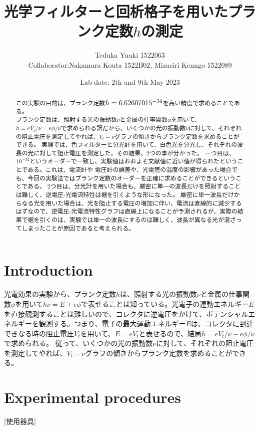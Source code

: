 \documentclass[a4paper,12pt]{jsarticle}
\begin{document}
\title{光学フィルターと回析格子を用いたプランク定数$h$の測定}
\author{Teduka Yuuki 1522063 
\\
Collaborator:Nakamura Kouta 1522B02, Mizusiri Kenngo 1522089 }
\date{Lab date: 2th and 9th May 2023}
\maketitle

\begin{abstract}
この実験の目的は、プランク定数$h = 6.62607015 \time 10^{-34}$を高い精度で求めることである。\\プランク定数は、照射する光の振動数$\nu$と金属の仕事関数$\phi$を用いて、$h = {eV_t}/{\nu} - {e\phi}/{\nu}$で求められる訳だから、いくつかの光の振動数$\nu$に対して、それぞれの阻止電圧を測定してやれば、$V_t-\nu$グラフの傾きからプランク定数を求めることができる。
実験では、色フィルターと分光計を用いて、白色光を分光し、それぞれの波長の光に対して阻止電圧を測定した。その結果、2つの事が分かった。
一つ目は、$10^{-34}$というオーダーで一致し、実験値はおおよそ文献値に近い値が得られたということである。これは、電流計や
電圧計の誤差や、光電管の温度の影響があった場合でも、今回の実験法ではプランク定数のオーダーを正確に求めることができるということである。
2つ目は、分光計を用いた場合も、厳密に単一の波長だけを照射することは難しく、逆電圧-光電流特性は裾を引くような形になった。
厳密に単一波長だけからなる光を用いた場合は、光を阻止する電圧の増加に伴い、電流は直線的に減少するはずなので、逆電圧-光電流特性グラフは直線上になることが予測されるが、実際の結果で裾を引くのは、実験では単一の波長にするのは難しく、波長が異なる光が混ざってしまったことが原因であると考えられる。
\end{abstract}


\section{Introduction}
光電効果の実験から、プランク定数$h$は、照射する光の振動数$\nu$と金属の仕事関数$\phi$を用いて$h\nu = E + e\phi$で表せることは知っている。光電子の運動エネルギー$E$を直接観測することは難しいので、コレクタに逆電圧をかけて、ポテンシャルエネルギーを観測する。つまり、電子の最大運動エネルギー$E$は、コレクタに到達できなる時の阻止電圧$V_t$を用いて、$E = eV_t$と表せるので、結局$h = {eV_t}/{\nu} - {e\phi}/{\nu}$で求められる。
従って、いくつかの光の振動数$\nu$に対して、それぞれの阻止電圧を測定してやれば、$V_t-\nu$グラフの傾きからプランク定数を求めることができる。

\section{Experimental procedures}
[使用器具]
\end{document}
